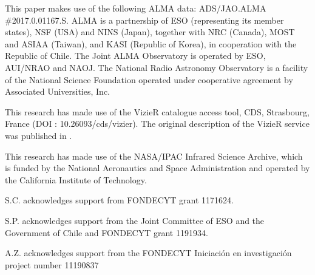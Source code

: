 \documentclass[usenatbib,times]{mnras}
\begin{document}
This paper makes use of the following ALMA data: ADS/JAO.ALMA \#2017.0.01167.S. ALMA is a partnership of ESO (representing its member states), NSF (USA) and NINS (Japan), together with NRC (Canada), MOST and ASIAA (Taiwan), and KASI (Republic of Korea), in cooperation with the Republic of Chile. The Joint ALMA Observatory is operated by ESO, AUI/NRAO and NAOJ. The National Radio Astronomy Observatory is a facility of the National Science Foundation operated under cooperative agreement by Associated Universities, Inc.
 
This research has made use of the VizieR catalogue access tool, CDS, Strasbourg, France (DOI : 10.26093/cds/vizier). The original description of the VizieR service was published in \citet{2000A&AS..143...23O}.

This research has made use of the NASA/IPAC Infrared Science Archive, which is funded by the National Aeronautics and Space Administration and operated by the California Institute of Technology.

S.C. acknowledges support from FONDECYT grant 1171624. 

S.P. acknowledges support from the Joint Committee of ESO and the Government of Chile and FONDECYT grant 1191934.

A.Z. acknowledges support from the FONDECYT Iniciaci\'on en investigaci\'on project number 11190837












\bsp	%
\label{lastpage}
\end{document}
